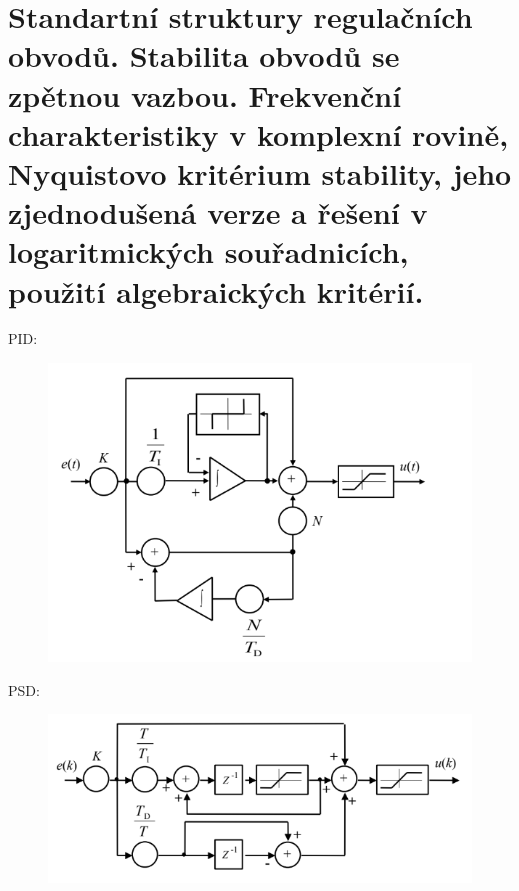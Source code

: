 \section{Standartní struktury regulačních obvodů. Stabilita obvodů se zpětnou vazbou. Frekvenční charakteristiky v komplexní rovině, Nyquistovo kritérium stability, jeho zjednodušená verze a řešení v logaritmických souřadnicích, použití algebraických kritérií.}
PID:
\begin{figure}[H]
    \includegraphics*[scale = 1.1]{images/PIDschema.png}
\end{figure}


PSD:
\begin{figure}[H]
    \includegraphics*[scale = 1.1]{images/PSDschema.png}
\end{figure}
\newpage

